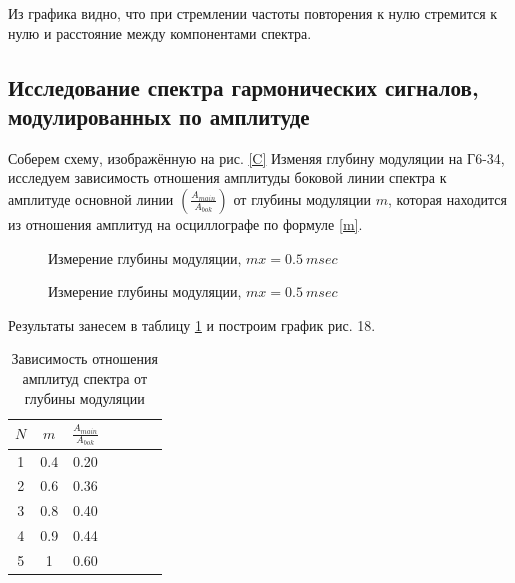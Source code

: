   
  Из графика видно, что при стремлении частоты повторения к нулю стремится к нулю и расстояние между компонентами спектра.  
  
  \subsection{Исследование спектра гармонических сигналов, модулированных по амплитуде}
  	
  	Соберем схему, изображённую на рис. \ref{C}
  	Изменяя глубину модуляции на Г6-34, исследуем зависимость
  	отношения амплитуды боковой линии спектра к амплитуде основной линии $ \left(\frac{A_{main}}{A_{bok}}\right ) $ от глубины модуляции $ m $, которая находится из отношения амплитуд на осциллографе по формуле \eqref{m}.
  	
  	 \begin{figure}[h!]
  	\begin{minipage}[h]{0.5\linewidth}
  		\caption{Измерение глубины модуляции, $mx = 0.5 \:  msec$}
  		\label{A_tau}
  	\end{minipage}
  	\begin{minipage}[h]{0.5\linewidth}
  		\caption{Измерение глубины модуляции, $mx = 0.5 \:  msec$}
  		\label{A_f}
  	\end{minipage}
  \end{figure}
  	
  	Результаты занесем в таблицу \ref{C_table} и построим график рис. 18. 
  	
  	
  	\begin{table}[h]
  		\caption{Зависимость отношения амплитуд спектра от глубины модуляции}
  		\begin{center}
  			\begin{tabular}{|c|c|c|c|c|c|c|}
  				\hline
  				$ N $  & $ m $ & $ \frac{A_{main}}{A_{bok}} $\\
  				\hline
  			1 & 0.4 & 0.20  \\
  				\hline
  			2 & 0.6 & 0.36  \\
  				\hline
  			3 & 0.8 & 0.40  \\
  				\hline
  			4 & 0.9 & 0.44  \\
  				\hline
  			5 & 1 & 0.60     \\
  				\hline
  			\end{tabular}
  		\end{center}
  		\label{C_table}
  	\end{table}
  	
